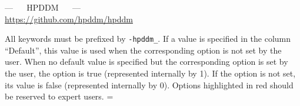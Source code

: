 \documentclass{article}
\begin{document}
\begin{center} {\LARGE --- $\quad$ HPDDM $\quad$ ---} \\[5pt] \url{https://github.com/hpddm/hpddm} \end{center}
    All keywords must be prefixed by \texttt{-hpddm\_}. If a value is specified in the column ``Default'', this value is used when the corresponding option is not set by the user. When no default value is specified but the corresponding option is set by the user, the option is true (represented internally by 1). If the option is not set, its value is false (represented internally by 0). Options highlighted in \colorbox{LightRed}{red} should be reserved to expert users.
\vspace*{-0.6cm}
\newdimen\origiwspc
\origiwspc=\font
\newlength\LTbackup
\setlength{\LTbackup}{\LTleft}
\setlength{\LTleft}{0.15cm}
\end{document}
